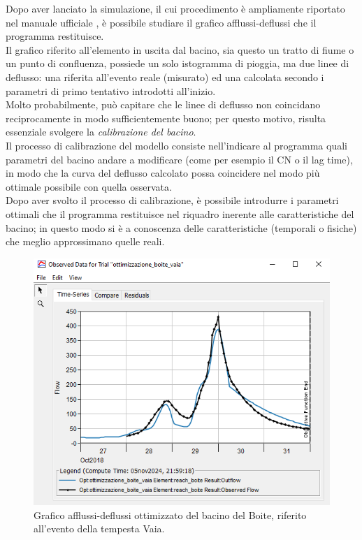 Dopo aver lanciato la simulazione, il cui procedimento è ampliamente riportato nel manuale ufficiale \cite{manual_hec_hms}, è possibile studiare il grafico afflussi-deflussi che il programma restituisce.\\
Il grafico riferito all'elemento in uscita dal bacino, sia questo un tratto di fiume o un punto di confluenza, possiede un solo istogramma di pioggia, ma due linee di deflusso: una riferita all'evento reale (misurato) ed una calcolata secondo i parametri di primo tentativo introdotti all'inizio.\\
Molto probabilmente, può capitare che le linee di deflusso non coincidano reciprocamente in modo sufficientemente buono; per questo motivo, risulta essenziale svolgere la \textit{calibrazione del bacino}.\\
Il processo di calibrazione del modello consiste nell'indicare al programma quali parametri del bacino andare a modificare (come per esempio il CN o il lag time), in modo che la curva del deflusso calcolato possa coincidere nel modo più ottimale possibile con quella osservata.\\
Dopo aver svolto il processo di calibrazione, è possibile introdurre i parametri ottimali che il programma restituisce nel riquadro inerente alle caratteristiche del bacino; in questo modo si è a conoscenza delle caratteristiche (temporali o fisiche) che meglio approssimano quelle reali.
\begin{figure}[H]\centering
\includegraphics[scale=1]{immagini/ottim_boite.PNG}
\caption{Grafico afflussi-deflussi ottimizzato del bacino del Boite, riferito all'evento della tempesta Vaia.}
    \label{ottim_boite}    
\end{figure}

